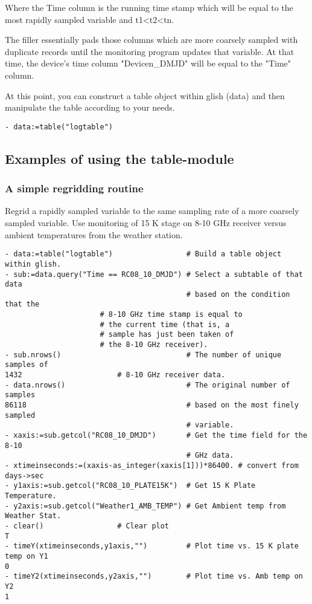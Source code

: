 Where the Time column is the running time stamp which will be equal to the
most rapidly sampled variable and t1<t2<tn. 

The filler essentially pads
those columns which are more coarsely sampled with duplicate records until
the monitoring program updates that variable. At that time, the device's
time column "Devicen\_DMJD" will be equal to the "Time" column.

At this point, you can construct a table object within glish (data) and then
manipulate the table according to your needs.

\begin{verbatim}
- data:=table("logtable")
\end{verbatim}

 
\subsection{Examples of using the table-module}

\subsubsection{A simple regridding routine}

Regrid a rapidly sampled variable to the same sampling rate of a more
coarsely sampled variable. Use monitoring of 15 K stage on 8-10 GHz
receiver versus ambient temperatures from the weather station.

\begin{verbatim}
- data:=table("logtable")                 # Build a table object within glish.
- sub:=data.query("Time == RC08_10_DMJD") # Select a subtable of that data
                                          # based on the condition that the
					  # 8-10 GHz time stamp is equal to
					  # the current time (that is, a 
					  # sample has just been taken of
					  # the 8-10 GHz receiver).
- sub.nrows()                             # The number of unique samples of
1432   					  # 8-10 GHz receiver data.
- data.nrows()                            # The original number of samples
86118                                     # based on the most finely sampled
                                          # variable.
- xaxis:=sub.getcol("RC08_10_DMJD")       # Get the time field for the 8-10 
                                          # GHz data.
- xtimeinseconds:=(xaxis-as_integer(xaxis[1]))*86400. # convert from days->sec
- y1axis:=sub.getcol("RC08_10_PLATE15K")  # Get 15 K Plate Temperature.
- y2axis:=sub.getcol("Weather1_AMB_TEMP") # Get Ambient temp from Weather Stat.
- clear() 				  # Clear plot
T 
- timeY(xtimeinseconds,y1axis,"")         # Plot time vs. 15 K plate temp on Y1
0 
- timeY2(xtimeinseconds,y2axis,"")        # Plot time vs. Amb temp on Y2
1 
\end{verbatim}

